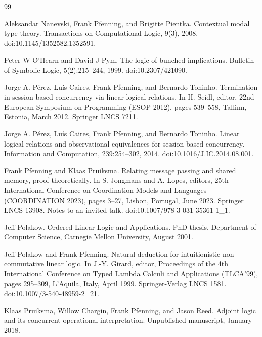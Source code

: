 \documentclass[10pt,a4paper]{amsart}
\begin{document}
\begin{thebibliography}{99}
\par\noindent  [31]  Aleksandar Nanevski, Frank Pfenning, and Brigitte Pientka.  Contextual modal type theory.  Transactions on Computational Logic, 9(3), 2008.  doi:10.1145/1352582.1352591.  
 
\par\noindent  [32]  Peter W O’Hearn and David J Pym.  The logic of bunched implications.  Bulletin of Symbolic Logic, 5(2):215–244, 1999.  doi:10.2307/421090.  
 
\par\noindent  [33]  Jorge A. Pérez, Luís Caires, Frank Pfenning, and Bernardo Toninho.  Termination in session-based concurrency via linear logical relations.  In H. Seidl, editor, 22nd European Symposium on Programming (ESOP 2012), pages 539–558, Tallinn, Estonia, March 2012. Springer LNCS 7211.  
 
\par\noindent  [34]  Jorge A. Pérez, Luís Caires, Frank Pfenning, and Bernardo Toninho.  Linear logical relations and observational equivalences for session-based concurrency.  Information and Computation, 239:254–302, 2014.  doi:10.1016/J.IC.2014.08.001.  
 
\par\noindent  [35]  Frank Pfenning and Klaas Pruiksma.  Relating message passing and shared memory, proof-theoretically.  In S. Jongmans and A. Lopes, editors, 25th International Conference on Coordination Models and Languages (COORDINATION 2023), pages 3–27, Lisbon, Portugal, June 2023. Springer LNCS 13908.  Notes to an invited talk.  doi:10.1007/978-3-031-35361-1\_1.  
 
\par\noindent  [36]  Jeff Polakow.  Ordered Linear Logic and Applications.  PhD thesis, Department of Computer Science, Carnegie Mellon University, August 2001.  
 
\par\noindent  [37]  Jeff Polakow and Frank Pfenning.  Natural deduction for intuitionistic non-commutative linear logic.  In J.-Y. Girard, editor, Proceedings of the 4th International Conference on Typed Lambda Calculi and Applications (TLCA’99), pages 295–309, L’Aquila, Italy, April 1999. Springer-Verlag LNCS 1581.  doi:10.1007/3-540-48959-2\_21.  
 
\par\noindent  [38]  Klaas Pruiksma, Willow Chargin, Frank Pfenning, and Jason Reed.  Adjoint logic and its concurrent operational interpretation.  Unpublished manuscript, January 2018.  
 

\end{thebibliography}
\end{document}

